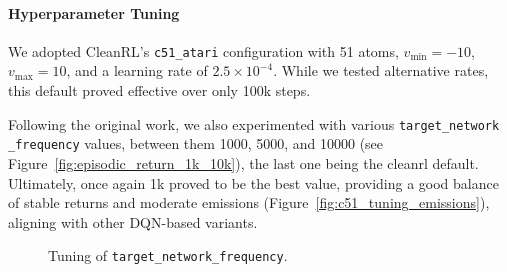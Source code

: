 \paragraph{Hyperparameter Tuning}
We adopted CleanRL's \texttt{c51\_atari} configuration with 51 atoms, $v_{\min}=-10$, $v_{\max}=10$, 
and a learning rate of $2.5\times10^{-4}$. While we tested alternative rates, 
this default proved effective over only 100k steps.  

Following the original work, we also experimented with various \texttt{target\_network\\\_frequency} values, between them \num{1000}, \num{5000}, and \num{10000} (see Figure~\ref{fig:episodic_return_1k_10k}), the last one being the cleanrl default. Ultimately, once again 1k proved to be the best value, providing a good balance of stable returns and moderate emissions (Figure~\ref{fig:c51_tuning_emissions}), aligning with other DQN-based variants.

\begin{figure}
	\centering
	\quad
	\caption{Tuning of \texttt{target\_network\_frequency}.}
	\label{fig:c51_tuning}
\end{figure}

